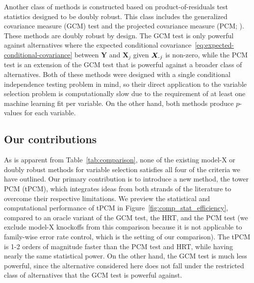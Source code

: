 \documentclass[12pt]{article}
\theoremstyle{definition}
\theoremstyle{remark}
\newcommand{\prx}{\bm X}								%
\newcommand{\pry}{{\bm Y}}								%
\newcommand{\minus}{\textnormal{-}} 						    %
\begin{document}
	Another class of methods is constructed based on product-of-residuals test statistics designed to be doubly robust. This class includes the generalized covariance measure (GCM) test \citep{Shah2018} and the projected covariance measure (PCM; \cite{Lundborg2022a}). These methods are doubly robust by design. The GCM test is only powerful against alternatives where the expected conditional covariance~\eqref{eq:expected-conditional-covariance} between $\pry$ and $\prx_j$ given $\prx_{\minus j}$ is non-zero, while the PCM test is an extension of the GCM test that is powerful against a broader class of alternatives. Both of these methods were designed with a single conditional independence testing problem in mind, so their direct application to the variable selection problem is computationally slow due to the requirement of at least one machine learning fit per variable. On the other hand, both methods produce $p$-values for each variable. 
	
	\subsection{Our contributions} \label{sec:our-contributions}
	
	As is apparent from Table~\ref{tab:comparison}, none of the existing model-X or doubly robust methods for variable selection satisfies all four of the criteria we have outlined. Our primary contribution is to introduce a new method, the tower PCM (tPCM), which integrates ideas from both strands of the literature to overcome their respective limitations. We preview the statistical and computational performance of tPCM in Figure~\ref{fig:comp_stat_efficiency}, compared to an oracle variant of the GCM test, the HRT, and the PCM test (we exclude model-X knockoffs from this comparison because it is not applicable to family-wise error rate control, which is the setting of our comparison). The tPCM is 1-2 orders of magnitude faster than the PCM test and HRT, while having nearly the same statistical power. On the other hand, the GCM test is much less powerful, since the alternative considered here does not fall under the restricted class of alternatives that the GCM test is powerful against.
\end{document}
